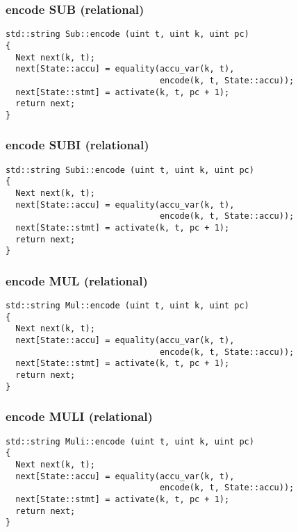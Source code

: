 \subsubsection{encode SUB (relational)}

\begin{lstlisting}[style=c++]
std::string Sub::encode (uint t, uint k, uint pc)
{
  Next next(k, t);
  next[State::accu] = equality(accu_var(k, t),
                               encode(k, t, State::accu));
  next[State::stmt] = activate(k, t, pc + 1);
  return next;
}
\end{lstlisting}

\subsubsection{encode SUBI (relational)}

\begin{lstlisting}[style=c++]
std::string Subi::encode (uint t, uint k, uint pc)
{
  Next next(k, t);
  next[State::accu] = equality(accu_var(k, t),
                               encode(k, t, State::accu));
  next[State::stmt] = activate(k, t, pc + 1);
  return next;
}
\end{lstlisting}

\subsubsection{encode MUL (relational)}

\begin{lstlisting}[style=c++]
std::string Mul::encode (uint t, uint k, uint pc)
{
  Next next(k, t);
  next[State::accu] = equality(accu_var(k, t),
                               encode(k, t, State::accu));
  next[State::stmt] = activate(k, t, pc + 1);
  return next;
}
\end{lstlisting}

\subsubsection{encode MULI (relational)}

\begin{lstlisting}[style=c++]
std::string Muli::encode (uint t, uint k, uint pc)
{
  Next next(k, t);
  next[State::accu] = equality(accu_var(k, t),
                               encode(k, t, State::accu));
  next[State::stmt] = activate(k, t, pc + 1);
  return next;
}
\end{lstlisting}

